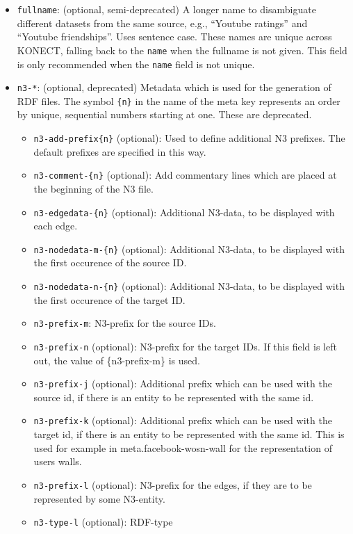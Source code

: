 \documentclass{article}
\begin{document}
\begin{itemize}
\item \texttt{fullname}: (optional, semi-deprecated) A longer name to disambiguate
  different datasets from the same source, e.g., ``Youtube
  ratings'' and ``Youtube friendships''.  Uses sentence case.  These
  names are unique across KONECT, falling back to the \texttt{name} when
  the fullname is not given.  This field is only recommended when the
  \texttt{name} field is not unique. 
\item \texttt{n3-*}: (optional, deprecated) Metadata which is used for the
  generation of RDF files. The symbol \texttt{\{n\}} in the name
  of the meta key represents an order by unique, sequential
  numbers starting at one.  These are deprecated. 
  \begin{itemize}
  \item \texttt{n3-add-prefix\{n\}} (optional):
    Used to define additional N3 prefixes. The
    default prefixes are specified in this way.
  \item \texttt{n3-comment-\{n\}} (optional): Add
    commentary lines which are placed at the
    beginning of the N3 file.
  \item \texttt{n3-edgedata-\{n\}} (optional):
    Additional N3-data, to be displayed with each
    edge.
  \item \texttt{n3-nodedata-m-\{n\}} (optional):
    Additional N3-data, to be displayed with the
    first occurence of the source ID.
  \item \texttt{n3-nodedata-n-\{n\}} (optional):
    Additional N3-data, to be displayed with the
    first occurence of the target ID.
  \item \texttt{n3-prefix-m}: N3-prefix for the
    source IDs.
  \item \texttt{n3-prefix-n} (optional): N3-prefix
    for the target IDs. If this field is left out,
    the value of \{n3-prefix-m\} is used.
  \item \texttt{n3-prefix-j} (optional):
    Additional prefix which can be used with the
    source id, if there is an entity to be
    represented with the same id.
  \item \texttt{n3-prefix-k} (optional):
    Additional prefix which can be used with the
    target id, if there is an entity to be
    represented with the same id. This is used for
    example in meta.facebook-wosn-wall for the
    representation of users walls.
  \item \texttt{n3-prefix-l} (optional): N3-prefix
    for the edges, if they are to be represented
    by some N3-entity.
  \item \texttt{n3-type-l} (optional): RDF-type

\end{itemize}
\end{itemize}
\end{document}
